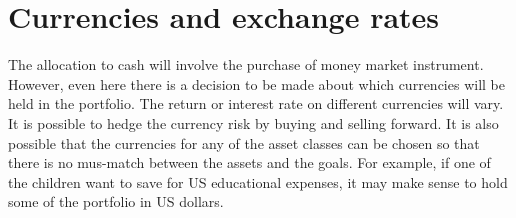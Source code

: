 \documentclass[12pt, a4paper, oneside]{article}\usepackage[]{graphicx}\usepackage[]{color}
\begin{document}
\section*{Currencies and exchange rates}
The allocation to cash will involve the purchase of money market instrument.  However, even here there is a decision to be made about which currencies will be held in the portfolio.  The return or interest rate on different currencies will vary.  It is possible to hedge the currency risk by buying and selling forward. It is also possible that the currencies for any of the asset classes can be chosen so that there is no mus-match between the assets and the goals.  For example, if one of the children want to save for US educational expenses, it may make sense to hold some of the portfolio in US dollars.  
\end{document}
